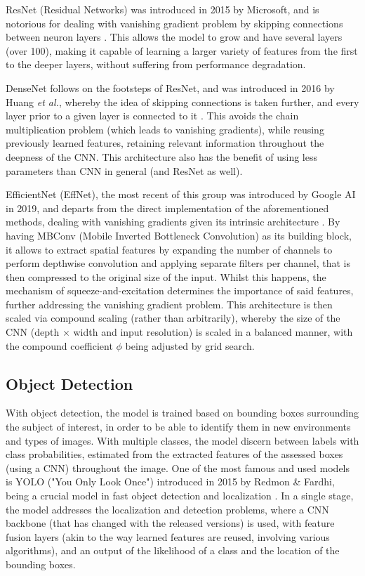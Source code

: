 \documentclass[conference]{IEEEtran}
\begin{document}
ResNet (Residual Networks) was introduced in 2015 by Microsoft, and is notorious for dealing with vanishing gradient problem by skipping connections between neuron layers \cite{ResNet}. This allows the model to grow and have several layers (over 100), making it capable of learning a larger variety of features from the first to the deeper layers, without suffering from performance degradation.

DenseNet follows on the footsteps of ResNet, and was introduced in 2016 by Huang \textit{et al.}, whereby the idea of skipping connections is taken further, and every layer prior to a given layer is connected to it \cite{DenseNet}. This avoids the chain multiplication problem (which leads to vanishing gradients), while reusing previously learned features, retaining relevant information throughout the deepness of the CNN. This architecture also has the benefit of using less parameters than CNN in general (and ResNet as well).

EfficientNet (EffNet), the most recent of this group was introduced by Google AI in 2019, and departs from the direct implementation of the aforementioned methods, dealing with vanishing gradients given its intrinsic architecture \cite{EffienctNet}. By having MBConv (Mobile Inverted Bottleneck Convolution) as its building block, it allows to extract spatial features by expanding the number of channels to perform depthwise convolution and applying separate filters per channel, that is then compressed to the original size of the input. Whilst this happens, the mechanism of squeeze-and-excitation determines the importance of said features, further addressing the vanishing gradient problem. This architecture is then scaled via compound scaling (rather than arbitrarily), whereby the size of the CNN (depth $\times$ width and input resolution) is scaled in a balanced manner, with the compound coefficient $\phi$ being adjusted by grid search.

\subsection{Object Detection}

With object detection, the model is trained based on bounding boxes surrounding the subject of interest, in order to be able to identify them in new environments and types of images. With multiple classes, the model discern between labels with class probabilities, estimated from the extracted features of the assessed boxes (using a CNN) throughout the image. One of the most famous and used models is YOLO ("You Only Look Once") introduced in 2015 by Redmon \& Fardhi, being a crucial model in fast object detection and localization \cite{YOLO}. In a single stage, the model addresses the localization and detection problems, where a CNN backbone (that has changed with the released versions) is used, with feature fusion layers (akin to the way learned features are reused, involving various algorithms), and an output of the likelihood of a class and the location of the bounding boxes.
\end{document}
